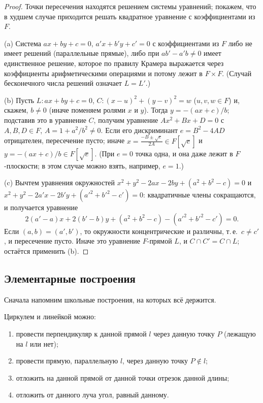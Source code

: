 \begin{proof}
Точки пересечения находятся решением системы уравнений; покажем, что в худшем случае приходится решать квадратное
уравнение с коэффициентами из $F$.

(a) Система $ax+by+c=0$, $a'x+b'y+c'=0$ с коэффициентами из $F$ либо не имеет решений (параллельные прямые), либо
при $ab'-a'b\ne0$ имеет единственное решение, которое по правилу Крамера выражается через коэффициенты
арифметическими операциями и потому лежит в $F\times F$. (Случай бесконечного числа решений означает $L=L'$.)

(b) Пусть $L\colon ax+by+c=0$, $C\colon(x-u)^2+(y-v)^2=w$ ($u,v,w\in F$) и, скажем, $b\ne0$ (иначе поменяем ролями $x$ и
$y$). Тогда $y=-(ax+c)/b$; подставив это в уравнение $C$, получим уравнение $Ax^2+Bx+D=0$ с $A,B,D\in F$, $A=1+a^2/b^2\ne0$. Если его дискриминант
$e=B^2-4AD$ отрицателен, пересечение пусто; иначе $x=\frac{-B\pm\sqrt e}{2A}\in F[\sqrt e]$ и $y=-(ax+c)/b\in F[\sqrt e]$.
(При $e=0$ точка одна, и она даже лежит в $F$-плоскости; в этом случае можно взять, например, $e=1$.)

(c) Вычтем уравнения окружностей $x^2+y^2-2ax-2by+(a^2+b^2-c)=0$ и $x^2+y^2-2a'x-2b'y+(a'^2+b'^2-c')=0$:
квадратичные члены сокращаются, и получается уравнение
\[
2(a'-a)x+2(b'-b)y+(a^2+b^2-c)-(a'^2+b'^2-c')=0 .
\]
Если $(a,b)=(a',b')$, то окружности концентрические и различны, т.\,е.\ $c\ne c'$, и пересечение пусто. Иначе это
уравнение $F$-прямой $L$, и $C\cap C'=C\cap L$; остаётся применить (b).
\end{proof}

\subsection*{Элементарные построения}

Сначала напомним школьные построения, на которых всё держится.

\begin{lemma}[1.35a]
Циркулем и линейкой можно:
\begin{enumerate}[label=(\alph*)]
\item провести перпендикуляр к данной прямой $l$ через данную точку $P$ (лежащую на $l$ или нет);
\item провести прямую, параллельную $l$, через данную точку $P\notin l$;
\item отложить на данной прямой от данной точки отрезок данной длины;
\item отложить от данного луча угол, равный данному.
\end{enumerate}
\end{lemma}

